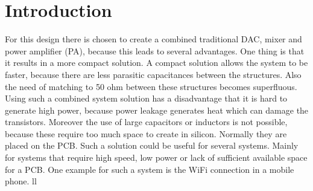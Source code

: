 \section{Introduction} \label{sec:introduction}
For this design there is chosen to create a combined traditional DAC, mixer and power amplifier (PA), because this leads to several advantages. One thing is that it results in a more compact solution. A compact solution allows the system to be faster, because there are less parasitic capacitances between the structures. Also the need of matching to 50 ohm between these structures becomes superfluous. Using such a combined system solution has a disadvantage that it is hard to generate high power, because power leakage generates heat which can damage the transistors. Moreover the use of large capacitors or inductors is not possible, because these require too much space to create in silicon. Normally they are placed on the PCB.
Such a solution could be useful for several systems. Mainly for systems that require high speed, low power or lack of sufficient available space for a PCB. One example for such a system is the WiFi connection in a mobile phone.
ll


